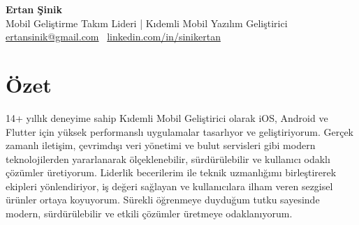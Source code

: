 \documentclass[10pt,a4paper]{extarticle}
\begin{document}
\begin{center}
    \begin{minipage}{\textwidth}
        \centering
        {\Huge\textbf{Ertan Şinik}}\\[5pt]
		{\Large Mobil Geliştirme Takım Lideri | Kıdemli Mobil Yazılım Geliştirici}\\[5pt]
        \href{mailto:ertansinik@gmail.com}{ertansinik@gmail.com} \textbullet\
        \href{https://linkedin.com/in/sinikertan}{linkedin.com/in/sinikertan}
    \end{minipage}
\end{center}
\section{Özet}
14+ yıllık deneyime sahip Kıdemli Mobil Geliştirici olarak iOS, Android ve Flutter için yüksek performanslı uygulamalar tasarlıyor ve geliştiriyorum. Gerçek zamanlı iletişim, çevrimdışı veri yönetimi ve bulut servisleri gibi modern teknolojilerden yararlanarak ölçeklenebilir, sürdürülebilir ve kullanıcı odaklı çözümler üretiyorum. Liderlik becerilerim ile teknik uzmanlığımı birleştirerek ekipleri yönlendiriyor, iş değeri sağlayan ve kullanıcılara ilham veren sezgisel ürünler ortaya koyuyorum. Sürekli öğrenmeye duyduğum tutku sayesinde modern, sürdürülebilir ve etkili çözümler üretmeye odaklanıyorum.
\end{document}
